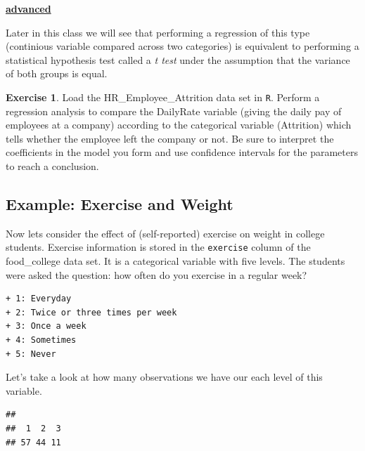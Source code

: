 \documentclass[
]{book}
\newenvironment{Shaded}{\begin{snugshade}}{\end{snugshade}}
\newcommand{\FunctionTok}[1]{\textcolor[rgb]{0.00,0.00,0.00}{#1}}
\newcommand{\NormalTok}[1]{#1}
\newcommand{\SpecialCharTok}[1]{\textcolor[rgb]{0.00,0.00,0.00}{#1}}
\newenvironment{rmdblock}[1]
  {\begin{shaded*}
  \centerline{\underline{\textbf{#1}}}

  }
  {
  \end{shaded*}
  }
\newenvironment{advanced}
  {\begin{rmdblock}{advanced}}
  {\end{rmdblock}}
\theoremstyle{definition}
\theoremstyle{definition}
\theoremstyle{definition}
\newtheorem{exercise}{Exercise}[chapter]
\theoremstyle{definition}
\theoremstyle{remark}
\begin{document}
\begin{advanced}
Later in this class we will see that performing a regression of this type (continious variable compared across two categories) is equivalent to performing a statistical hypothesis test called a \emph{t test} under the assumption that the variance of both groups is equal.
\end{advanced}

\begin{exercise}
\protect\hypertarget{exr:unnamed-chunk-460}{}\label{exr:unnamed-chunk-460}Load the HR\_Employee\_Attrition data set in \texttt{R}. Perform a regression analysis to compare the DailyRate variable (giving the daily pay of employees at a company) according to the categorical variable (Attrition) which tells whether the employee left the company or not. Be sure to interpret the coefficients in the model you form and use confidence intervals for the parameters to reach a conclusion.
\end{exercise}

\hypertarget{example-exercise-and-weight}{%
\subsection{Example: Exercise and Weight}\label{example-exercise-and-weight}}

Now lets consider the effect of (self-reported) exercise on weight in college students. Exercise information is stored in the \texttt{exercise} column of the food\_college data set. It is a categorical variable with five levels. The students were asked the question: how often do you exercise in a regular week?

\begin{verbatim}
+ 1: Everyday 
+ 2: Twice or three times per week 
+ 3: Once a week 
+ 4: Sometimes 
+ 5: Never
\end{verbatim}

Let's take a look at how many observations we have our each level of this variable.

\begin{Shaded}
\end{Shaded}

\begin{verbatim}
## 
##  1  2  3 
## 57 44 11
\end{verbatim}
\end{document}
